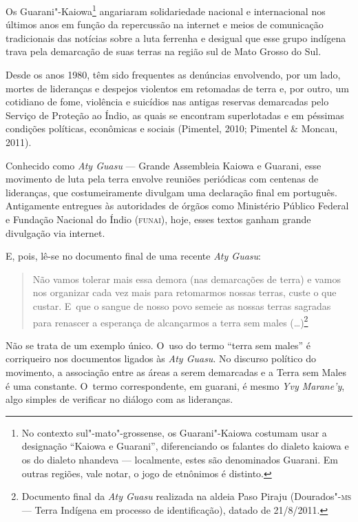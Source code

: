 \noindent
Os Guarani"-Kaiowa\footnote{No contexto sul"-mato"-grossense, os
Guarani"-Kaiowa costumam usar a designação ``Kaiowa e Guarani'',
diferenciando os falantes do dialeto kaiowa e os do dialeto nhandeva ---
localmente, estes são denominados Guarani. Em outras regiões, vale
notar, o jogo de etnônimos é distinto.} angariaram solidariedade
nacional e internacional nos últimos anos em função da repercussão na
internet e meios de comunicação tradicionais das notícias sobre a luta
ferrenha e desigual que esse grupo indígena trava pela demarcação de
suas terras na região sul de Mato Grosso do Sul.

Desde os anos 1980, têm sido frequentes as denúncias envolvendo, por um
lado, mortes de lideranças e despejos violentos em retomadas de terra
e, por outro, um cotidiano de fome, violência e suicídios nas antigas
reservas demarcadas pelo Serviço de Proteção ao Índio, as quais se
encontram superlotadas e em péssimas condições políticas, econômicas e
sociais (Pimentel, 2010; Pimentel \& Moncau, 2011).

Conhecido como \emph{Aty Guasu} --- Grande Assembleia Kaiowa e Guarani, esse
movimento de luta pela terra envolve reuniões periódicas com centenas
de lideranças, que costumeiramente divulgam uma declaração final em
português. Antigamente entregues às autoridades de órgãos como
Ministério Público Federal e Fundação Nacional do Índio (\textsc{funai}), hoje,
esses textos ganham grande divulgação via internet.

E, pois, lê-se no documento final de uma recente \emph{Aty Guasu}:

\begin{quote}
\noindent
Não vamos tolerar mais essa demora (nas demarcações de terra) e vamos
nos organizar cada vez mais para retomarmos nossas terras, custe o que
custar. E~que o sangue de nosso povo semeie as nossas terras sagradas
para renascer a esperança de alcançarmos a terra sem males
(\ldots{})\footnote{Documento final da \emph{Aty Guasu} realizada na aldeia Paso
Piraju (Dourados"-\textsc{ms} --- Terra Indígena em processo de identificação),
datado de 21/8/2011.}
\end{quote}

Não se trata de um exemplo único. O~uso do termo ``terra sem males'' é
corriqueiro nos documentos ligados às \emph{Aty Guasu}. No discurso político
do movimento, a associação entre as áreas a serem demarcadas e a Terra
sem Males é uma constante. O~termo correspondente, em guarani, é mesmo
\emph{Yvy Marane’y}, algo simples de verificar no diálogo com as lideranças.

